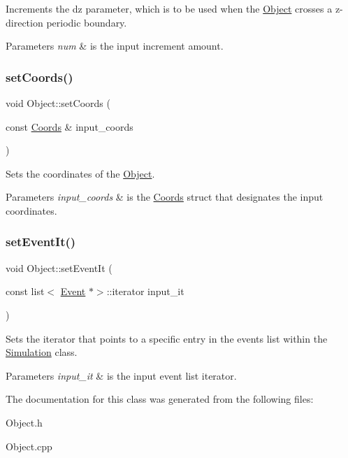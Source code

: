 Increments the dz parameter, which is to be used when the \hyperlink{class_object}{Object} crosses a z-\/direction periodic boundary. 


\begin{DoxyParams}{Parameters}
{\em num} & is the input increment amount. \\
\hline
\end{DoxyParams}
\mbox{\label{class_object_a34a164e4709e5daaba7a38c3d61ae617}} 
\subsubsection{\texorpdfstring{set\+Coords()}{setCoords()}}
{\footnotesize\ttfamily void Object\+::set\+Coords (\begin{DoxyParamCaption}\item[{const \hyperlink{struct_coords}{Coords} \&}]{input\+\_\+coords }\end{DoxyParamCaption})}



Sets the coordinates of the \hyperlink{class_object}{Object}. 


\begin{DoxyParams}{Parameters}
{\em input\+\_\+coords} & is the \hyperlink{struct_coords}{Coords} struct that designates the input coordinates. \\
\hline
\end{DoxyParams}
\mbox{\label{class_object_ae39c4b0bd4e6a5f07f3d0e07e32061ec}} 
\subsubsection{\texorpdfstring{set\+Event\+It()}{setEventIt()}}
{\footnotesize\ttfamily void Object\+::set\+Event\+It (\begin{DoxyParamCaption}\item[{const list$<$ \hyperlink{class_event}{Event} $\ast$$>$\+::iterator}]{input\+\_\+it }\end{DoxyParamCaption})}



Sets the iterator that points to a specific entry in the events list within the \hyperlink{class_simulation}{Simulation} class. 


\begin{DoxyParams}{Parameters}
{\em input\+\_\+it} & is the input event list iterator. \\
\hline
\end{DoxyParams}


The documentation for this class was generated from the following files\+:\begin{DoxyCompactItemize}
\item 
Object.\+h\item 
Object.\+cpp\end{DoxyCompactItemize}
